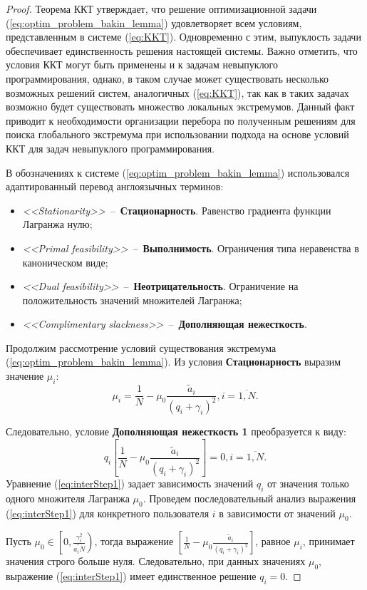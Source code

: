 \begin{proof}
Теорема ККТ утверждает, что решение оптимизационной задачи (\ref{eq:optim_problem_bakin_lemma}) удовлетворяет всем условиям, представленным в системе (\ref{eq:KKT}). Одновременно с этим, выпуклость задачи обеспечивает единственность решения настоящей системы. Важно отметить, что условия ККТ могут быть применены и к задачам невыпуклого программирования, однако, в таком случае может существовать несколько возможных решений систем, аналогичных (\ref{eq:KKT}), так как в таких задачах возможно будет существовать множество локальных экстремумов. Данный факт приводит к необходимости организации перебора по полученным решениям для поиска глобального экстремума при использовании подхода на основе условий ККТ для задач невыпуклого программирования.

В обозначениях к системе (\ref{eq:optim_problem_bakin_lemma}) использовался адаптированный перевод англоязычных терминов:
\begin{itemize}
\item \textit{<<Stationarity>>}~--~\textbf{Стационарность}. Равенство градиента функции Лагранжа нулю;
\item \textit{<<Primal feasibility>>}~--~\textbf{Выполнимость}. Ограничения типа неравенства в каноническом виде;
\item \textit{<<Dual feasibility>>}~--~\textbf{Неотрицательность}. Ограничение на положительность значений множителей Лагранжа;
\item \textit{<<Complimentary slackness>>}~--~\textbf{Дополняющая нежесткость}.
\end{itemize}

Продолжим рассмотрение условий существования экстремума (\ref{eq:optim_problem_bakin_lemma}). Из условия \textbf{Стационарность} выразим значение $\mu_i$:
$$\mu_i = \frac{1}{N} - \mu_0 \frac{\tilde{a}_i}{(q_i + \gamma_i)^2}, i = \overline{1,N}.$$

Следовательно, условие \textbf{Дополняющая нежесткость 1} преобразуется к виду:
\begin{equation}
q_i \left[\frac{1}{N} - \mu_0 \frac{\tilde{a}_i}{(q_i + \gamma_i)^2}\right] = 0, i = \overline{1,N}.
\label{eq:interStep1}
\end{equation}
Уравнение (\ref{eq:interStep1}) задает зависимость значений $q_i$ от значения только одного множителя Лагранжа $\mu_0$. Проведем последовательный анализ выражения (\ref{eq:interStep1}) для конкретного пользователя $i$ в зависимости от значений $\mu_0$.

Пусть $\mu_0 \in \left[0, \frac{\gamma_i^2}{\tilde{a_i N}}\right)$, тогда выражение $\left[\frac{1}{N} - \mu_0 \frac{\tilde{a}_i}{(q_i + \gamma_i)^2}\right]$, равное $\mu_i$, принимает значения строго больше нуля. Следовательно, при данных значениях $\mu_0$, выражение (\ref{eq:interStep1}) имеет единственное решение $q_i = 0$.


\end{proof}
